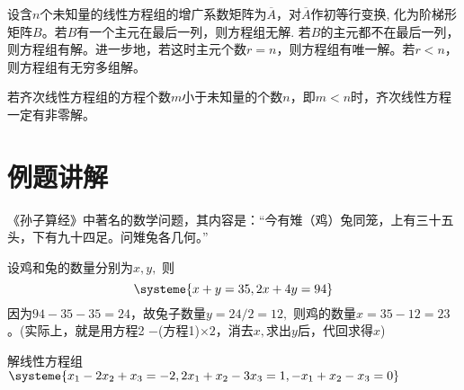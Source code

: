 \begin{thm}
设含$n$个未知量的线性方程组的增广系数矩阵为$\overline{A}$，对$\overline{A}$作初等行变换, 化为阶梯形矩阵$B$。若$B$有一个主元在最后一列，则方程组无解. 若$B$的主元都不在最后一列，则方程组有解。进一步地，若这时主元个数$r=n$，则方程组有唯一解。若$r<n$，则方程组有无穷多组解。
\end{thm}


\begin{thm}
若齐次线性方程组的方程个数$m$小于未知量的个数$n$，即$m<n$时，齐次线性方程一定有非零解。
\end{thm}


\section{例题讲解}

\begin{eg}
《孙子算经》中著名的数学问题，其内容是：“今有雉（鸡）兔同笼，上有三十五头，下有九十四足。问雉兔各几何。”
\end{eg}
\begin{solution}
设鸡和兔的数量分别为$x, y,$  则
$$\systeme{ x + y = 35, 2x + 4y = 94}$$
因为$94-35-35=24$，故兔子数量$y=24/2=12,$ 则鸡的数量$x=35-12=23$。(实际上，就是用方程2 $-$(方程1)$\times 2$，消去$x,$求出$y$后，代回求得$x$)
\end{solution}

\vspace{1.5em}

\begin{eg}
解线性方程组
$\systeme{x_1 - 2x_2 + x_3 = -2 , 2x_1 + x_2 - 3x_3 = 1 , -x_1 + x_2 - x_3 = 0}$
\end{eg}

